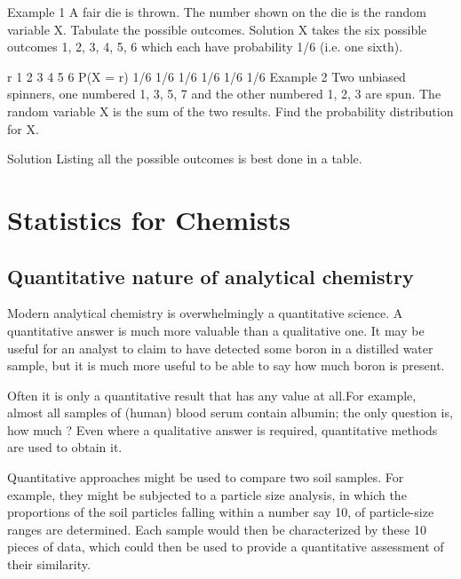 Example 1
A fair die is thrown. The number shown on the die is the random variable X. Tabulate the possible outcomes.
Solution
X takes the six possible outcomes 1, 2, 3, 4, 5, 6 which each have probability 1/6 (i.e. one sixth).

r 	1 	2 	3 	4 	5 	6
P(X = r)	1/6 	1/6 	1/6 	1/6 	1/6 	1/6
Example 2
Two unbiased spinners, one numbered 1, 3, 5, 7 and the other numbered 1, 2, 3 are spun. The random variable X is the sum of the two results.
Find the probability distribution for X.



Solution
Listing all the possible outcomes is best done in a table.








%
%
%
%

\newpage
\chapter{Statistics for Chemists}

\section{Quantitative nature of analytical chemistry}
Modern analytical chemistry is overwhelmingly a quantitative science.
A quantitative answer is much more valuable than a qualitative one.
It may be useful for an analyst to claim to have detected some boron in a
distilled water sample, but it is much more useful to be able to say how
much boron is present.

Often it is only a quantitative result that has any value at all.For
example, almost all samples of (human) blood serum contain albumin;
the only question is, how much ? Even where a qualitative answer is required, quantitative methods are
used to obtain it.

Quantitative approaches might be used to compare two soil samples. For example, they might be subjected to a particle
size analysis, in which the proportions of the soil particles falling within a number say 10, of particle-size ranges are determined. Each sample would then be characterized by these 10 pieces of data, which could
then be used to provide a quantitative assessment of their similarity.

